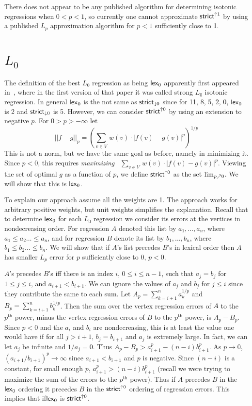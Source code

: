\documentclass[11pt]{article}
\newcommand{\Strictdown}[2]{\ensuremath{\mathsf{strict}_{\downarrow{#1}}\ifthenelse{\equal{#2}{}}{}{(#2)}}}
\newcommand{\Strictup}[2]{\ensuremath{\mathsf{strict}^{\uparrow {#1}}\ifthenelse{\equal{#2}{}}{}{(#2)}}}
\newcommand{\lex}[2]{\ensuremath{\mathsf{lex}_{#1} \ifthenelse{\equal{#2}{}}{}{(#2)}}}
\begin{document}
There does not appear to be any published algorithm for determining isotonic regressions when $0<p<1$, so currently one cannot approximate \Strictup{1}{} by using a published $L_p$ approximation algorithm for $p<1$ sufficiently close to 1. 



\section{$L_0$} \label{sec:L0}


The definition of the best $L_0$ regression as being \lex{0}{} apparently first appeared in~\cite{QL0Secondary}, where in the first version of that paper it was called strong $L_0$ isotonic regression.
In general \lex{0}{} is the not same as \Strictdown{0}{} since for 11, 8, 5, 2, 0, \lex{0}{} is 2 and \Strictdown{0}{} is 5.
However, we can consider \Strictup{0}{} by using an extension to negative $p$. 
For $0 > p > -\infty$  let 
$$
|| f - g ||_p = (\sum_{v \in V}\, w(v) \!\cdot\! |f(v) - g(v)|^p)^{1/p}
$$
\noindent This is not a norm, but we have the same goal as before, namely in minimizing it.
Since $p < 0$, this requires \textit{maximizing}~ $\sum_{v \in V}\, w(v) \!\cdot\! |f(v) - g(v)|^p$.
Viewing the set of optimal $g$ as a function of $p$, we define \Strictup{0}{} as the set
$\lim_{p{\scalebox{0.7}{$\nearrow$}} 0}$.
We will show that this is \lex{0}{}.

 To explain our approach assume all the weights are 1. 
 The approach works for arbitrary positive weights, but unit weights simplifies the explanation.
 Recall that to determine \lex{0}{} for each $L_0$ regression we consider its errors at the vertices in nondecreasing order.
 For regression $A$ denoted this list by $a_1, \ldots, a_n$, where $a_1 \leq  a_2 \ldots \leq a_n$,
 and for regression $B$ denote its list by $b_1, \ldots, b_n$, where $b_1 \leq b_2 \ldots  \leq b_n$.
 We will show that if $A$'s list precedes $B$'s in lexical order then $A$ has smaller $L_p$ error for $p$ sufficiently close to 0, $p < 0$.
 
 $A$'s precedes $B$'s iff there is an index $i$, $0 \leq i \leq n-1$, such that $a_j = b_j$ for $1\leq j \leq i$, and $a_{i+1} < b_{i+1}$. 
 We can ignore the values of $a_j$ and $b_j$ for $j \leq i$ since they contribute the same to each sum.
 Let $A_p = \sum_{k=i+1}^n a_k^{1/p}$ and $B_p=\sum_{k=i+1}^n b_k^{1/p}$.
 Then the sum over the vertex regression errors of $A$ to the $p^\mathrm{th}$ power, minus the vertex regression errors of $B$ to the $p^\mathrm{th}$ power, is $A_p - B_p$.
Since $p <0$ and the $a_i$ and $b_i$ are nondecreasing, this is at least the value one would have if for all $j > i+1$, $b_j = b_{i+1}$ and $a_j$ is extremely large.
In fact, we can let $a_j$ be infinite and $1/a_j = 0$.
Thus $A_p-B_p > a_{i+1}^p - (n-i) b_{i+1}^p$.
As $p\rightarrow 0$, $(a_{i+1}/b_{i+1})^p \rightarrow \infty$ since $a_{i+1} < b_{i+1}$ and $p$ is negative.
Since $(n-i)$ is a constant, for small enough $p$, $a_{i+1}^p > (n-i) b_{i+1}^p$ (recall we were trying to maximize the sum of the errors to the $p^\mathrm{th}$ power).
Thus if $A$ precedes $B$ in the \lex{0}{} ordering it precedes $B$ in the \Strictup{0}{} ordering of regression errors.
This implies that if\lex{0}{} is \Strictup{0}{}.
 
\end{document}
